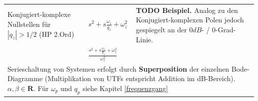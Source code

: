 \begin{landscape}
\begin{longtable}{|p{5cm}|l|ll|ll|}
		Konjugiert-komplexe Nullstellen
		für $|q_z| > 1/2$ (HP 2.Ord)&
		$s^2+s\frac{\omega_z}{q_z}+\omega_z^2$ &
		\multicolumn{4}{l|}{
\textbf{			TODO Beispiel. }Analog zu den Konjugiert-komplexen Polen jedoch gespiegelt an der $0dB$- / $0$-Grad-Linie.
  		}
		\\
		&
		$\frac{s^2+s\frac{\omega_z}{q_z}+\omega_z^2}{\omega_z^2}$ &
		\multicolumn{4}{l|}{}
		\\ \hline
		\multicolumn{6}{|p{21cm}|}{
			Serieschaltung von Systemen erfolgt durch \textbf{Superposition} der einzelnen Bode-Diagramme 
			(Multiplikation von UTFs entspricht Addition im	dB-Bereich). $\alpha , \beta \in \mathbf{R}$. 
			Für $\omega_p$ und $q_p$ siehe Kapitel \ref{frequenzgang}
		}
		\\ \hline
	\end{longtable}
	\renewcommand{\arraystretch}{\arraystretchOriginal}
\end{landscape}
\clearpage
\twocolumn